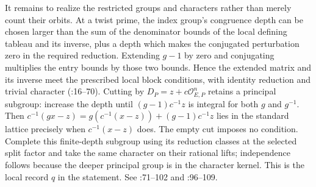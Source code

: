 It remains to realize the restricted groups and characters rather
than merely count their orbits. At a twist prime, the index group's
congruence depth can be chosen larger than the sum of the denominator
bounds of the local defining tableau and its inverse, plus a depth
which makes the conjugated perturbation zero in the required
reduction. Extending $g-1$ by zero and conjugating multiplies the
entry bounds by those two bounds. Hence the extended matrix and its
inverse meet the prescribed local block conditions, with identity
reduction and trivial character (:16--70).
Cutting by $D_P=z+c\mathcal O_{E,P}^n$ retains a principal subgroup:
increase the depth until $(g-1)c^{-1}z$ is integral for both $g$
and $g^{-1}$. Then $c^{-1}(gx-z)=g(c^{-1}(x-z))+(g-1)c^{-1}z$
lies in the standard lattice precisely when $c^{-1}(x-z)$ does.
The empty cut imposes no condition. Complete this finite-depth
subgroup using its reduction classes at the selected split factor
and take the same character on their rational lifts; independence
follows because the deeper principal group is in the character kernel.
This is the local record $q$ in the statement. See
:71--102 and
:96--109.


